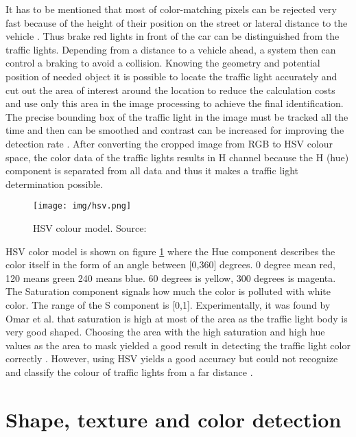 \documentclass[letterpaper, 10 pt, conference]{ieeeconf} %
\begin{document}
It has to be mentioned that most of color-matching pixels can be rejected very fast because of the height of their position on the street or lateral distance to the vehicle \cite{c4}. Thus brake red lights in front of the car can be distinguished from the traffic lights. Depending from a distance to a vehicle ahead, a system then can control a braking to avoid a collision. Knowing the geometry and potential position of needed object it is possible to locate the traffic light accurately and cut out the area of interest around the location to reduce the calculation costs and use only this area in the image processing to achieve the final identification. The precise bounding box of the traffic light in the image must be tracked all the time and then can be smoothed and contrast can be increased for improving the detection rate \cite{c7}. After converting the cropped image from RGB to HSV colour space, the color data of the traffic lights results in H channel because the H (hue) component is separated from all data and thus it makes a traffic light determination possible.

\begin{figure}[thpb]
	\centering
	\texttt{[image: img/hsv.png]}
	\caption{HSV colour model. Source: \cite{c7}} 
	\label{hsv}
\end{figure}

HSV color model is shown on figure \ref{hsv} where the Hue component describes the color itself in the form of an angle between [0,360] degrees. 0 degree mean red, 120 means green 240 means blue. 60 degrees is yellow, 300 degrees is magenta. The Saturation component signals how much the color is polluted with white color. The range of the S component is [0,1]. Experimentally, it was found by Omar et al. that saturation is high at most of the area as the traffic light body is very good shaped. Choosing the area with the high saturation and high hue values as the area to mask yielded a good result in detecting the traffic light color correctly \cite{c7}. However, using HSV yields a good accuracy but could not recognize and classify the colour of traffic lights from a far distance \cite{c7}.


\section{Shape, texture and color detection}
 
\end{document}
